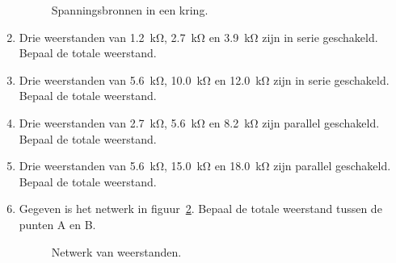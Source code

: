 \begin{enumerate}[labelindent=0pt,labelwidth=\widthof{8.88.\ },label=\textbf{\thechapter.\arabic*.},leftmargin=!,ref=\thechapter.\arabic*]
\begin{figure}[!ht]
\centering
{}
\caption{Spanningsbronnen in een kring.}
\label{fig:gelspanningswet1}
\end{figure}%

\item
\label{que:gelserie1}
Drie weerstanden van \SI{1.2}{\kilo\ohm}, \SI{2.7}{\kilo\ohm} en \SI{3.9}{\kilo\ohm} zijn in serie geschakeld. Bepaal de totale weerstand.

\item
\label{que:gelserie2}
Drie weerstanden van \SI{5.6}{\kilo\ohm}, \SI{10.0}{\kilo\ohm} en \SI{12.0}{\kilo\ohm} zijn in serie geschakeld. Bepaal de totale weerstand.

\item
\label{que:gelparallel1}
Drie weerstanden van \SI{2.7}{\kilo\ohm}, \SI{5.6}{\kilo\ohm} en \SI{8.2}{\kilo\ohm} zijn parallel geschakeld. Bepaal de totale weerstand.

\item
\label{que:gelparallel2}
Drie weerstanden van \SI{5.6}{\kilo\ohm}, \SI{15.0}{\kilo\ohm} en \SI{18.0}{\kilo\ohm} zijn parallel geschakeld. Bepaal de totale weerstand.

\item
\label{que:gelserieparallel1}
Gegeven is het netwerk in figuur~\ref{fig:gelserieparallel1}. Bepaal de totale weerstand tussen de punten A en B.

\begin{figure}[!ht]
\centering
{}
\caption{Netwerk van weerstanden.}
\label{fig:gelserieparallel1}
\end{figure}


\end{enumerate}
